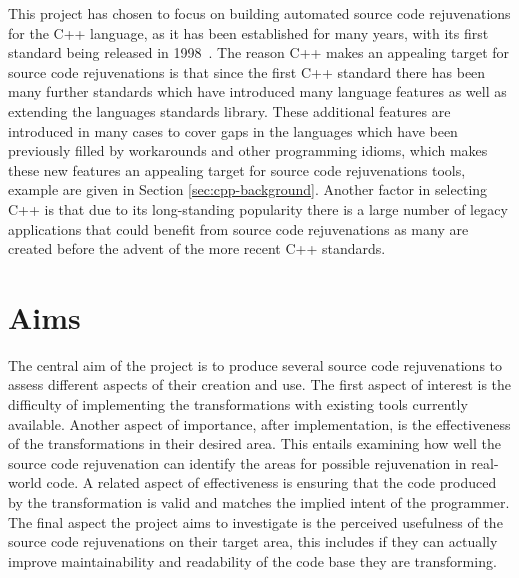 \documentclass[bsc,frontabs,singlespacing,twoside,parskip,deptreport]{infthesis}
\begin{document}
This project has chosen to focus on building automated source code rejuvenations for the C++ language, as it has been established for many years, with its first standard being released in 1998~\cite{ISO:1998:IIP}. The reason C++ makes an appealing target for source code rejuvenations is that since the first C++ standard there has been many further standards which have introduced many language features as well as extending the languages standards library. These additional features are introduced in many cases to cover gaps in the languages which have been previously filled by workarounds and other programming idioms, which makes these new features an appealing target for source code rejuvenations tools, example are given in Section \ref{sec:cpp-background}. Another factor in selecting C++ is that due to its long-standing popularity there is a large number of legacy applications that could benefit from source code rejuvenations as many are created before the advent of the more recent C++ standards. 

% 






    



\section{Aims} %
The central aim of the project is to produce several source code rejuvenations to assess different aspects of their creation and use. The first aspect of interest is the difficulty of implementing the transformations with existing tools currently available. Another aspect of importance, after implementation, is the effectiveness of the transformations in their desired area. This entails examining how well the source code rejuvenation can identify the areas for possible rejuvenation in real-world code. A related aspect of effectiveness is ensuring that the code produced by the transformation is valid and matches the implied intent of the programmer. The final aspect the project aims to investigate is the perceived usefulness of the source code rejuvenations on their target area, this includes if they can actually improve maintainability and readability of the code base they are transforming.
\end{document}
